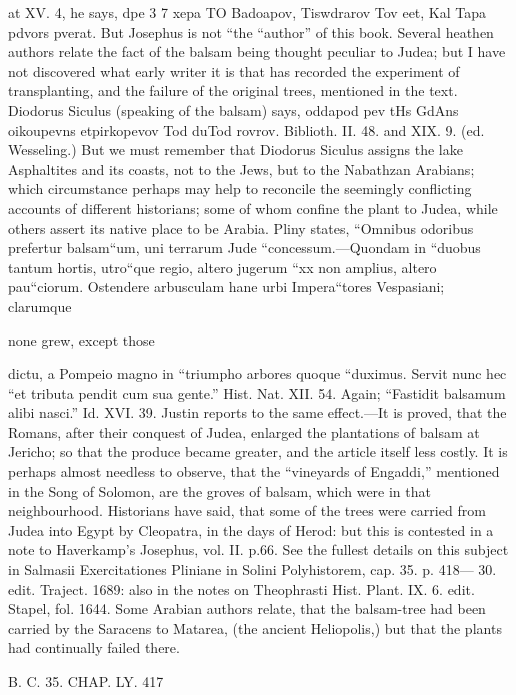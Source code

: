 at XV. 4, he says, dpe 3 7 xepa TO Badoapov, Tiswdrarov Tov eet, Kal Tapa pdvors pverat. But Josephus is not “the “author” of this book. Several heathen authors relate the fact of the balsam being thought peculiar to Judea; but I have not discovered what early writer it is that has recorded the experiment of transplanting, and the failure of the original trees, mentioned in the text. 
Diodorus Siculus (speaking of the balsam) says, oddapod pev tHs GdAns oikoupevns etpirkopevov Tod duTod rovrov. Biblioth. II. 48. and XIX. 9. (ed. Wesseling.) But we must remember that Diodorus Siculus assigns the lake Asphaltites and its coasts, not to the Jews, but to the Nabathzan Arabians; which circumstance perhaps may help to reconcile the seemingly conflicting accounts of different historians; some of whom confine the plant to Judea, while others assert its native place to be Arabia. 
Pliny states, “Omnibus odoribus prefertur balsam“um, uni terrarum Jude “concessum.—Quondam in “duobus tantum hortis, utro“que regio, altero jugerum “xx non amplius, altero pau“ciorum. Ostendere arbusculam hane urbi Impera“tores Vespasiani; clarumque 

none grew, except those 

 dictu, a Pompeio magno in “triumpho arbores quoque “duximus. Servit nunc hec “et tributa pendit cum sua gente.” Hist. Nat. XII. 54. Again; “Fastidit balsamum alibi nasci.” Id. XVI. 39. Justin reports to the same effect.—It is proved, that the Romans, after their conquest of Judea, enlarged the plantations of balsam at Jericho; so that the produce became greater, and the article itself less costly. It is perhaps almost needless to observe, that the “vineyards of Engaddi,” mentioned in the Song of Solomon, are the groves of balsam, which were in that neighbourhood. Historians have said, that some of the trees were carried from Judea into Egypt by Cleopatra, in the days of Herod: but this is contested in a note to Haverkamp’s Josephus, vol. II. p.66. See the fullest details on this subject in Salmasii Exercitationes Pliniane in Solini Polyhistorem, cap. 35. p. 418— 
30. edit. Traject. 1689: also in the notes on Theophrasti Hist. Plant. IX. 6. edit. Stapel, fol. 1644. 
Some Arabian authors relate, that the balsam-tree had been carried by the Saracens to Matarea, (the ancient Heliopolis,) but that the plants had continually failed there. 

B. C. 35. CHAP. LY. 417 

